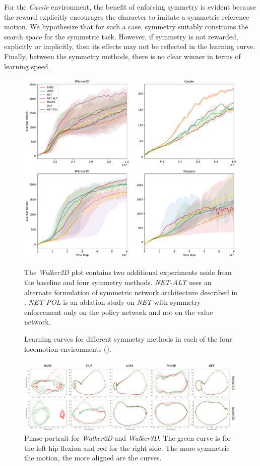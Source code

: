For the \textit{Cassie} environment, the benefit of enforcing symmetry is evident 
because the reward explicitly encourages the character to imitate a symmetric reference motion.  
We hypothesize that for such a case, symmetry suitably constrains the search space 
for the symmetric task. However, if symmetry is not rewarded, explicitly or implicitly, 
then its effects may not be reflected in the learning curve.  Finally, between the symmetry methods, 
there is no clear winner in terms of learning speed.

\begin{figure}[tbh]
  \centering
  \includegraphics[width=\columnwidth]{symmetry_figures/LearningCurves.pdf}
      \caption{Learning curves for different symmetry methods in each of the four locomotion environments ().}{The \textit{Walker2D} plot contains two additional experiments aside from the baseline and four symmetry methods.  \textit{NET-ALT} uses an alternate formulation of symmetric network architecture described in .  \textit{NET-POL} is an ablation study on \textit{NET} with symmetry enforcement only on the policy network and not on the value network.}
  \label{fig:learning-curves}
\end{figure}

\begin{figure}[tbh]
  \centering
  \includegraphics[width=\columnwidth]{symmetry_figures/phase_plots_smaller.pdf}
  \caption{Phase-portrait for \textit{Walker2D} and \textit{Walker3D}.  The green curve is for the left hip flexion and red for the right side.  The more symmetric the motion, the more aligned are the curves.}
  \label{fig:phase-portraits}
\end{figure}


